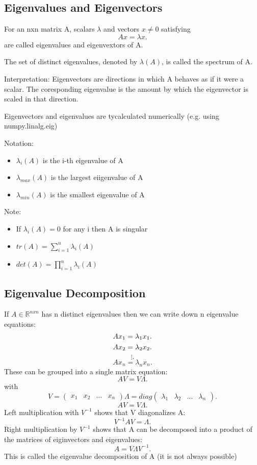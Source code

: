 \documentclass[a4paper]{article}
\newcommand{\R}{\mathbb{R}}
\newcommand{\0}{\mathbb{\emptyset}}
\begin{document}
	\subsection{Eigenvalues and Eigenvectors}
	For an nxn matrix A, scalars $\lambda$ and vectors $x\neq 0$ satisfying
	\[
	Ax =\lambda x
	.\] 
	are called eigenvalues and eigenvextors of A. \par
	The set of distinct eigenvalues, denoted by $\lambda(A)$, is called the
	spectrum of A. \par
	Interpretation: Eigenvectors are directions in which A behaves as if it
	were a scalar. The coresponding eigenvalue is the amount by which the
	eigenvector is scaled in that direction. \par
	Eigenvectors and eigenvalues are ty\pically calculated numerically (e.g.
	using numpy.linalg.eig)\par
	Notation:
	\begin{itemize}
		\item $\lambda_i(A)$ is the i-th eigenvalue of A
		\item  $\lambda_{max}(A)$ is the largest eiigenvalue of A
		\item $\lambda_{min}(A)$ is the smallest eigenvalue of A
	\end{itemize}
	Note:
	\begin{itemize}
		\item If $\lambda_i(A)=0$ for any i then A is singular
		\item $tr(A)=\sum_{i=1}^{n} \lambda_i(A)$ 
		\item $det(A)=\prod_{i=1}^{n} \lambda_i(A) $
	\end{itemize}
	\subsection{Eigenvalue Decomposition}
	If $A \in \R^{nxn}$ has n distinct eigenvalues then we can write down n
	eigenvalue equations:
	 \[
	Ax_1 = \lambda_1x_1 \\
	.\] 
	\[
	Ax_2 = \lambda_2x_2 \\
	.\] 
	\[
	\vdots
	.\] 
	\[
	Ax_n = \lambda_nx_n
	.\] 
	These can be grouped into a single matrix equation:
	\[
	AV = V\Lambda
	.\] 
	with
	\[
		V = \begin{pmatrix} x_1 & x_2  & \ldots & x_n \end{pmatrix} 
		\Lambda = diag\begin{pmatrix} \lambda_1 & \lambda_2 & \ldots &
		\lambda_n \end{pmatrix} 
	.\]
	\[
	AV=V\Lambda
	.\] 
	Left multiplication with $V^{-1}$ shows that V diagonalizes A:
	\[
		V^{-1}AV=\Lambda
	.\] 
	Right multiplication by $V^{-1}$ shows that A can be decomposed into a
	product of the matrices of eiginvectors and eigenvalues:
	\[
		A=V\Lambda V^{-1}
	.\] 
	This is called the eigenvalue decomposition of A (it is not always
	possible)
\end{document}
